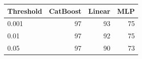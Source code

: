 \begin{tabular}{@{}lrrr@{}}
\toprule
Threshold & CatBoost & Linear & MLP \\
\midrule
0.001 & 97 & 93 & 75 \\
0.01 & 97 & 92 & 75 \\
0.05 & 97 & 90 & 73 \\
\bottomrule
\end{tabular}
